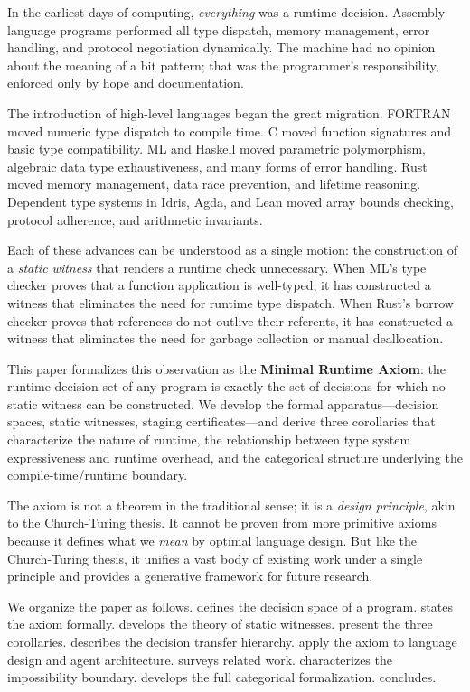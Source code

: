 \documentclass[11pt]{article}
\begin{document}
In the earliest days of computing, \emph{everything} was a runtime decision. Assembly
language programs performed all type dispatch, memory management, error handling, and
protocol negotiation dynamically. The machine had no opinion about the meaning of a
bit pattern; that was the programmer's responsibility, enforced only by hope and
documentation.

The introduction of high-level languages began the great migration. FORTRAN moved
numeric type dispatch to compile time. C moved function signatures and basic type
compatibility. ML and Haskell moved parametric polymorphism, algebraic data type
exhaustiveness, and many forms of error handling. Rust moved memory management, data
race prevention, and lifetime reasoning. Dependent type systems in Idris, Agda, and
Lean moved array bounds checking, protocol adherence, and arithmetic invariants.

Each of these advances can be understood as a single motion: the construction of a
\emph{static witness} that renders a runtime check unnecessary. When ML's type checker
proves that a function application is well-typed, it has constructed a witness that
eliminates the need for runtime type dispatch. When Rust's borrow checker proves that
references do not outlive their referents, it has constructed a witness that eliminates
the need for garbage collection or manual deallocation.

This paper formalizes this observation as the \textbf{Minimal Runtime Axiom}: the
runtime decision set of any program is exactly the set of decisions for which no
static witness can be constructed. We develop the formal apparatus---decision spaces,
static witnesses, staging certificates---and derive three corollaries that characterize
the nature of runtime, the relationship between type system expressiveness and runtime
overhead, and the categorical structure underlying the compile-time/runtime boundary.

The axiom is not a theorem in the traditional sense; it is a \emph{design principle},
akin to the Church-Turing thesis. It cannot be proven from more primitive axioms
because it defines what we \emph{mean} by optimal language design. But like the
Church-Turing thesis, it unifies a vast body of existing work under a single principle
and provides a generative framework for future research.

We organize the paper as follows.  defines the decision
space of a program.  states the axiom formally. 
develops the theory of static witnesses. 
present the three corollaries.  describes the decision transfer
hierarchy.  apply the axiom to language
design and agent architecture.  surveys related work.
 characterizes the impossibility boundary.
 develops the full categorical formalization.
 concludes.
\end{document}
